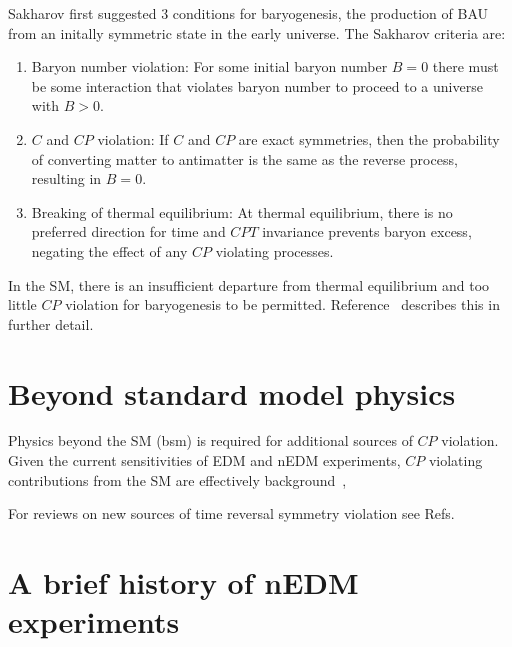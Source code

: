 Sakharov \cite{Sakharov_1991} first suggested 3 conditions for baryogenesis, the production of BAU from an initally symmetric state in the early universe. The Sakharov criteria are:
%
\begin{enumerate}
    \item Baryon number violation: For some initial baryon number $B=0$ there must be some interaction that violates baryon number to proceed to a universe with $B>0$.
    \item $C$ and $CP$ violation: If $C$ and $CP$ are exact symmetries, then the probability of converting matter to antimatter is the same as the reverse process, resulting in $B=0$.
    \item Breaking of thermal equilibrium:  At thermal equilibrium, there is no preferred direction for time and $CPT$ invariance prevents baryon excess, negating the effect of any $CP$ violating processes.
\end{enumerate}

In the SM, there is an insufficient departure from thermal equilibrium and too little $CP$ violation for baryogenesis to be permitted. Reference~\cite{Dubbers2011} describes this in further detail.


\section{Beyond standard model physics}


Physics beyond the SM (\acrshort{bsm}) is required for additional sources of $CP$ violation. Given the current sensitivities of EDM and nEDM experiments, $CP$ violating contributions from the SM are effectively background~\cite{CHU19}, 

For reviews on new sources of time reversal symmetry violation see Refs.~\cite{Cir10, POS05, ENG13, CHU19}


\section{A brief history of nEDM experiments}\label{sec:history_nedm}


